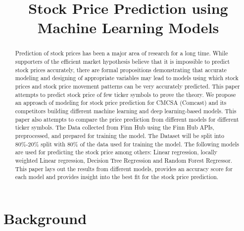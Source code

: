 \documentclass[conference]{IEEEtran}
\begin{document}
\title{Stock Price Prediction using Machine Learning Models}

\author{
}

\maketitle

\begin{abstract}
Prediction of stock prices has been a major area of research for a long time.
While supporters of the efficient market hypothesis believe that it is impossible to predict stock prices accurately, there are formal propositions demonstrating that accurate modeling and designing of appropriate variables may lead to models using which stock prices and stock price movement patterns can be very accurately predicted.
This paper attempts to predict stock price of few ticker symbols to prove the theory.
We propose an approach of modeling for stock price prediction for CMCSA (Comcast) and its competitors building different machine learning and deep learning-based models.
This paper also attempts to compare the price prediction from different models for different ticker symbols.
The Data collected from Finn Hub using the Finn Hub APIs, preprocessed, and prepared for training the model.
The Dataset will be split into 80\%-20\% split with 80\% of the data used for training the model.
The following models are used for predicting the stock price among others: Linear regression, locally weighted Linear regression, Decision Tree Regression and Random Forest Regressor.
This paper lays out the results from different models, provides an accuracy score for each model and provides insight into the best fit for the stock price prediction.
\end{abstract}

\section{Background}
\end{document}
